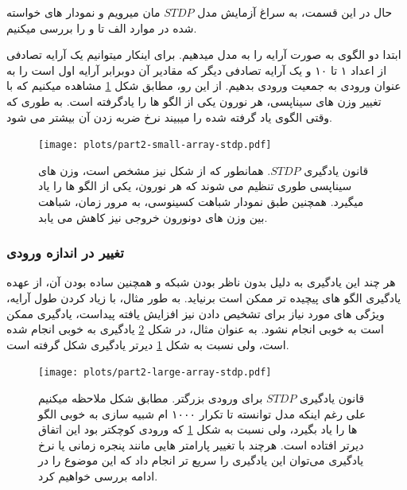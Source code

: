         حال در این قسمت، به سراغ آزمایش مدل 
        $STDP$ 
        مان میرویم و نمودار های خواسته شده در موارد الف تا و را بررسی میکنیم. 
        
        ابتدا دو الگوی به صورت آرایه را به مدل میدهیم. برای اینکار میتوانیم یک آرایه تصادفی از اعداد ۱ تا ۱۰ و یک آرایه تصادفی دیگر که مقادیر آن دوبرابر آرایه اول است را به عنوان ورودی به جمعیت ورودی بدهیم. از این رو، مطابق شکل 
        \ref{fig:part2-small-array-stdp}
        مشاهده میکنیم که با تغییر وزن های سیناپسی، هر نورون یکی از الگو ها را یادگرفته است. به طوری که وقتی الگوی یاد گرفته شده را میبیند نرخ ضربه زدن آن بیشتر می شود.
        \begin{figure}[!ht]
            \centering
            \texttt{[image: plots/part2-small-array-stdp.pdf]} 
            \caption{قانون یادگیری 
            $STDP$.
            همانطور که از شکل نیز مشخص است، وزن های سیناپسی طوری تنظیم می شوند که هر نورون، یکی از الگو ها را یاد میگیرد. همچنین طبق نمودار شباهت کسینوسی، به مرور زمان، شباهت بین وزن های دونورون خروجی نیز کاهش می یابد.}
            \label{fig:part2-small-array-stdp}
        \end{figure}

        \subsubsection*{تغییر در اندازه ورودی}
        هر چند این یادگیری به دلیل بدون ناظر بودن شبکه و همچنین ساده بودن آن، از عهده یادگیری الگو های پیچیده تر ممکن است برنیاید. به طور مثال، با زیاد کردن طول آرایه، ویژگی های مورد نیاز برای تشخیص دادن نیز افزایش یافته پیداست، یادگیری ممکن است به خوبی انجام نشود. به عنوان مثال، در شکل 
        \ref{fig:part2-large-array-stdp}
        یادگیری به خوبی انجام شده است، ولی نسبت به شکل 
        \ref{fig:part2-small-array-stdp} 
        دیرتر یادگیری شکل گرفته است.

        \begin{figure}[htbp]
            \centering
            \texttt{[image: plots/part2-large-array-stdp.pdf]} 
            \caption{قانون یادگیری 
            $STDP$ برای ورودی بزرگتر.
            مطابق شکل ملاحظه میکنیم علی رغم اینکه مدل توانسته تا تکرار ۱۰۰۰ ام شبیه سازی به خوبی الگو ها را یاد بگیرد، ولی نسبت به شکل
            \ref{fig:part2-small-array-stdp}
            که ورودی کوچکتر بود این اتفاق دیرتر افتاده است. هرچند با تغییر پارامتر هایی مانند پنجره زمانی یا نرخ یادگیری می‌توان این یادگیری را سریع تر انجام داد که این موضوع را در ادامه بررسی خواهیم کرد.}
            \label{fig:part2-large-array-stdp}
        \end{figure}
        
